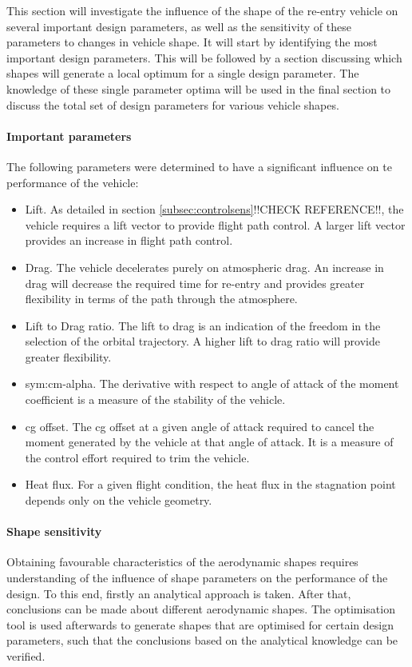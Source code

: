 This section will investigate the influence of the shape of the re-entry vehicle on several important design parameters, as well as the sensitivity of these parameters to changes in vehicle shape. It will start by identifying the most important design parameters. This will be followed by a section discussing which shapes will generate a local optimum for a single design parameter. The knowledge of these single parameter optima will be used in the final section to discuss the total set of design parameters for various vehicle shapes. 


\paragraph{Important parameters}
 The following parameters were determined to have a significant influence on te performance of the vehicle:

\begin{itemize}
	\item{Lift. As detailed in section \ref{subsec:controlsens}!!CHECK REFERENCE!!, the vehicle requires a lift vector to provide flight path control. A larger lift vector provides an increase in flight path control.}
	\item{Drag. The vehicle decelerates purely on atmospheric drag. An increase in drag will decrease the required time for re-entry and provides greater flexibility in terms of the path through the atmosphere. }
	\item{Lift to Drag ratio. The lift to drag is an indication of the freedom in the selection of the orbital trajectory. A higher lift to drag ratio will provide greater flexibility.}
	\item{\gls{sym:cm-alpha}. The derivative with respect to angle of attack of the moment coefficient is a measure of the stability of the vehicle. }
	\item{\gls{cg} offset}. The \gls{cg} offset at a given angle of attack required to cancel the moment generated by the vehicle at that angle of attack. It is a measure of the control effort required to trim the vehicle. 
	\item{Heat flux. For a given flight condition, the heat flux in the stagnation point depends only on the vehicle geometry.  }
\end{itemize}


\paragraph{Shape sensitivity} \label{sec:aerooptima}
Obtaining favourable characteristics of the aerodynamic shapes requires understanding of the influence of shape parameters on the performance of the design. To this end, firstly an analytical approach is taken. After that, conclusions can be made about different aerodynamic shapes. The optimisation tool is used afterwards to generate shapes that are optimised for certain design parameters, such that the conclusions based on the analytical knowledge can be verified.

